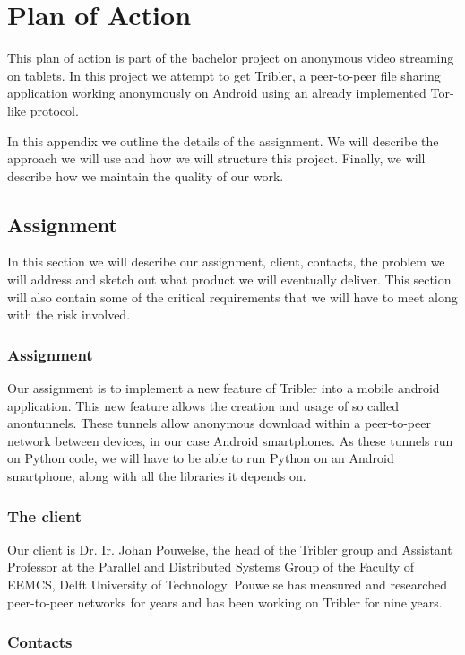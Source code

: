 \chapter{Plan of Action}
\label{cpt:planofaction}

This plan of action is part of the bachelor project on anonymous video streaming on tablets. In this project we attempt to get Tribler, a peer-to-peer file sharing application working anonymously on Android using an already implemented Tor-like protocol.

In this appendix we outline the details of the assignment. We will describe the approach we will use and how we will structure this project. Finally, we will describe how we maintain the quality of our work.

\section{Assignment}
In this section we will describe our assignment, client, contacts, the problem we will address and sketch out what product we will eventually deliver. This section will also contain some of the critical requirements that we will have to meet along with the risk involved.

\subsection{Assignment}
Our assignment is to implement a new feature of Tribler into a mobile android application. This new feature allows the creation and usage of so called anontunnels. These tunnels allow anonymous download within a peer-to-peer network between devices, in our case Android smartphones.
As these tunnels run on Python code, we will have to be able to run Python on an Android smartphone, along with all the libraries it depends on.

\subsection{The client}
Our client is Dr. Ir. Johan Pouwelse, the head of the Tribler group and Assistant Professor at the Parallel and Distributed Systems Group of the Faculty of EEMCS, Delft University of Technology. Pouwelse has measured and researched peer-to-peer networks for years and has been working on Tribler for nine years.

\subsection{Contacts}

